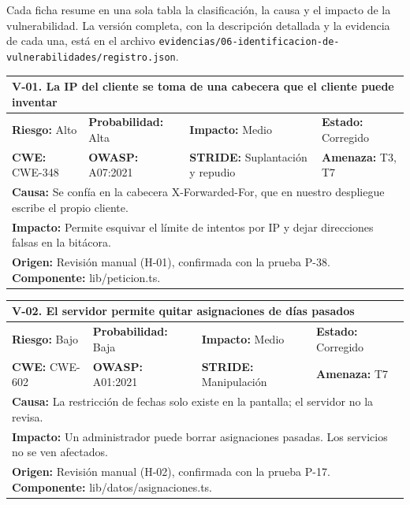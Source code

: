 \documentclass[12pt, letterpaper]{article}
\begin{document}
Cada ficha resume en una sola tabla la clasificación, la causa y el impacto de la vulnerabilidad. La versión completa, con la descripción detallada y la evidencia de cada una, está en el archivo \nolinkurl{evidencias/06-identificacion-de-vulnerabilidades/registro.json}.

\newlength{\celda}\setlength{\celda}{\dimexpr0.25\linewidth-2\tabcolsep-1.25\arrayrulewidth\relax}
\newlength{\fila}\setlength{\fila}{\dimexpr\linewidth-2\tabcolsep-2\arrayrulewidth\relax}
\begingroup\small\renewcommand{\arraystretch}{1.3}

\noindent\begin{tabular}{|p{\celda}|p{\celda}|p{\celda}|p{\celda}|}
\hline
\multicolumn{4}{|p{\fila}|}{\cellcolor{gray!12}\textbf{V-01. La IP del cliente se toma de una cabecera que el cliente puede inventar}} \\
\hline
\cellcolor{red!25}\textbf{Riesgo:} Alto & \textbf{Probabilidad:} Alta & \textbf{Impacto:} Medio & \textbf{Estado:} Corregido \\
\hline
\textbf{CWE:} CWE-348 & \textbf{OWASP:} A07:2021 & \textbf{STRIDE:} Suplantación y repudio & \textbf{Amenaza:} T3, T7 \\
\hline
\multicolumn{4}{|p{\fila}|}{\textbf{Causa:} Se confía en la cabecera X-Forwarded-For, que en nuestro despliegue escribe el propio cliente.} \\
\hline
\multicolumn{4}{|p{\fila}|}{\textbf{Impacto:} Permite esquivar el límite de intentos por IP y dejar direcciones falsas en la bitácora.} \\
\hline
\multicolumn{4}{|p{\fila}|}{\textbf{Origen:} Revisión manual (H-01), confirmada con la prueba P-38. \textbf{Componente:} lib/peticion.ts.} \\
\hline
\end{tabular}

\vspace{8pt}

\noindent\begin{tabular}{|p{\celda}|p{\celda}|p{\celda}|p{\celda}|}
\hline
\multicolumn{4}{|p{\fila}|}{\cellcolor{gray!12}\textbf{V-02. El servidor permite quitar asignaciones de días pasados}} \\
\hline
\cellcolor{yellow!25}\textbf{Riesgo:} Bajo & \textbf{Probabilidad:} Baja & \textbf{Impacto:} Medio & \textbf{Estado:} Corregido \\
\hline
\textbf{CWE:} CWE-602 & \textbf{OWASP:} A01:2021 & \textbf{STRIDE:} Manipulación & \textbf{Amenaza:} T7 \\
\hline
\multicolumn{4}{|p{\fila}|}{\textbf{Causa:} La restricción de fechas solo existe en la pantalla; el servidor no la revisa.} \\
\hline
\multicolumn{4}{|p{\fila}|}{\textbf{Impacto:} Un administrador puede borrar asignaciones pasadas. Los servicios no se ven afectados.} \\
\hline
\multicolumn{4}{|p{\fila}|}{\textbf{Origen:} Revisión manual (H-02), confirmada con la prueba P-17. \textbf{Componente:} lib/datos/asignaciones.ts.} \\
\hline
\end{tabular}
\end{document}
